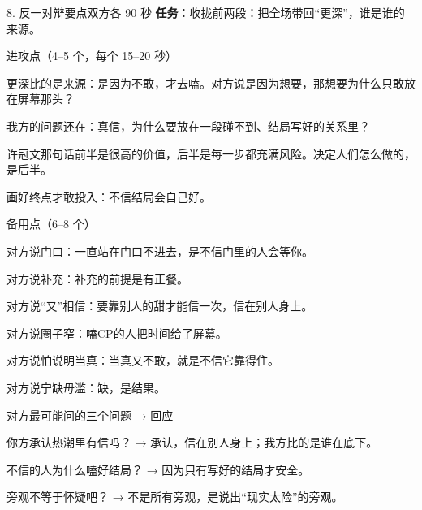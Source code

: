 \documentclass[script,con]{debate}
\begin{document}
\begin{stage}{8. 反一对辩要点}{双方各 90 秒}
\textbf{任务}：收拢前两段：把全场带回“更深”，谁是谁的来源。
\begin{points}{进攻点（4–5 个，每个 15–20 秒）}
\item 更深比的是来源：是因为不敢，才去嗑。对方说是因为想要，那想要为什么只敢放在屏幕那头？
\item 我方的问题还在：真信，为什么要放在一段碰不到、结局写好的关系里？
\item 许冠文那句话前半是很高的价值，后半是每一步都充满风险。决定人们怎么做的，是后半。
\item 画好终点才敢投入：不信结局会自己好。
\end{points}
\begin{points}{备用点（6–8 个）}
\item 对方说门口：一直站在门口不进去，是不信门里的人会等你。
\item 对方说补充：补充的前提是有正餐。
\item 对方说“又”相信：要靠别人的甜才能信一次，信在别人身上。
\item 对方说圈子窄：嗑CP的人把时间给了屏幕。
\item 对方说怕说明当真：当真又不敢，就是不信它靠得住。
\item 对方说宁缺毋滥：缺，是结果。
\end{points}
\begin{points}{对方最可能问的三个问题 → 回应}
\item 你方承认热潮里有信吗？ → 承认，信在别人身上；我方比的是谁在底下。
\item 不信的人为什么嗑好结局？ → 因为只有写好的结局才安全。
\item 旁观不等于怀疑吧？ → 不是所有旁观，是说出“现实太险”的旁观。
\end{points}
\end{stage}
\end{document}
